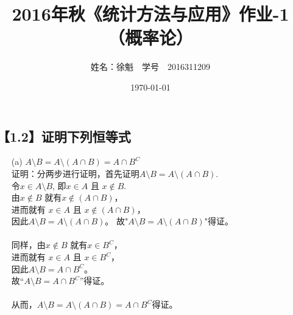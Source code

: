 \documentclass [12pt]{article}
\begin{document}
 \begin{CJK*}{GBK}{kai}
\newtheorem{theorem}{定理}
\newtheorem{definition}{定义}
\newtheorem{lemma}{引理}
\newtheorem{corollary}{推论}
\newtheorem{proposition}{性质}
\newtheorem{example}{例}
\newtheorem{remark}{注}
    \title{2016年秋《统计方法与应用》作业-1（概率论）}
    \author{ 姓名：徐魁\,\,\,\, 学号~~{2016311209}}
    \date{\today}
\maketitle

\section{【1.2】证明下列恒等式 }
\begin{enumerate}
  \item[(a)] $A \setminus B = A \setminus (A \cap B) = A \cap B^{C} $\\
 证明：分两步进行证明，首先证明$A \setminus B = A \setminus (A \cap B) $. \\
 令$x \in A \setminus B$, 即$x \in A$ 且 $x \notin B$. \\
 由$x \notin B$ 就有$x \notin ( A \cap B)$，\\
 进而就有 $x \in A$ 且 $x \notin ( A \cap B)$，\\
 因此$A \setminus B = A \setminus (A \cap B) $。
 故"$A \setminus B = A \setminus (A \cap B) $"得证。\\
 \\
 同样，由$x \notin B$ 就有$x \in B^{C}$，\\
进而就有 $x \in A$ 且 $x \in B^{C}$，\\
 因此$A \setminus B = A \cap B^{C} $。\\
 故“$A \setminus B = A \cap B^{C}  $”得证。\\
 \\
 从而，$A \setminus B = A \setminus (A \cap B) = A \cap B^{C} $得证。
 

\end{enumerate}
\end{CJK*}
\end{document}
